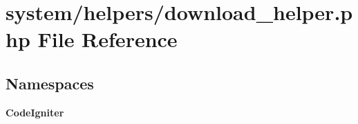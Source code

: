 \section{system/helpers/download\-\_\-helper.php File Reference}
\label{download__helper_8php}
\subsection*{Namespaces}
\begin{DoxyCompactItemize}
\item 
{\bf Code\-Igniter}
\end{DoxyCompactItemize}
